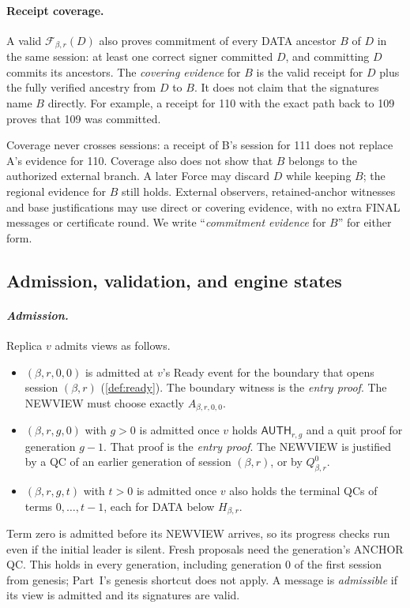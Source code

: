 \documentclass[11pt,a4paper]{article}
\newcommand{\FC}{\mathcal F}
\newcommand{\tagg}[1]{\ensuremath{\mathsf{#1}}}
\newcommand{\defterm}[1]{\textcolor{rrBlue}{\textit{#1}}}
\begin{document}
\paragraph{Receipt coverage.}
\label{sec:coverage}
A valid $\FC_{\beta,r}(D)$ also proves commitment of every DATA ancestor
$B$ of $D$ in the same session: at least one correct signer committed
$D$, and committing $D$ commits its ancestors. The \defterm{covering
evidence} for $B$ is the valid receipt for $D$ plus the fully verified
ancestry from $D$ to $B$. It does not claim that the signatures name $B$
directly. For example, a receipt for 110 with the exact path back to 109
proves that 109 was committed.

Coverage never crosses sessions: a receipt of B's session for 111 does
not replace A's evidence for 110. Coverage also does not show that $B$
belongs to the authorized external branch. A later Force may discard $D$
while keeping $B$; the regional evidence for $B$ still holds. External
observers, retained-anchor witnesses and base justifications may use
direct or covering evidence, with no extra FINAL messages or certificate
round. We write ``\defterm{commitment evidence} for $B$'' for either form.

\subsection{Admission, validation, and engine states}
\label{sec:admission}
\paragraph{\defterm{Admission.}}
Replica $v$ admits views as follows.
\begin{itemize}
\item $(\beta,r,0,0)$ is admitted at $v$'s Ready event for the boundary
that opens session $(\beta,r)$ (\cref{def:ready}). The boundary witness is
the \defterm{entry proof}. The NEWVIEW must choose exactly
$A_{\beta,r,0,0}$.
\item $(\beta,r,g,0)$ with $g>0$ is admitted once $v$ holds
$\tagg{AUTH}_{r,g}$ and a quit proof for generation $g-1$. That proof is
the \defterm{entry proof}. The NEWVIEW is justified by a QC of an earlier
generation of session $(\beta,r)$, or by $Q_{\beta,r}^0$.
\item $(\beta,r,g,t)$ with $t>0$ is admitted once $v$ also holds the
terminal QCs of terms $0,\ldots,t-1$, each for DATA below $H_{\beta,r}$.
\end{itemize}
Term zero is admitted before its NEWVIEW arrives, so its progress checks
run even if the initial leader is silent. Fresh proposals need the
generation's ANCHOR QC. This holds in every generation, including
generation $0$ of the first session from genesis; Part~I's genesis
shortcut does not apply. A message is \defterm{admissible} if its view is
admitted and its signatures are valid.
\end{document}
